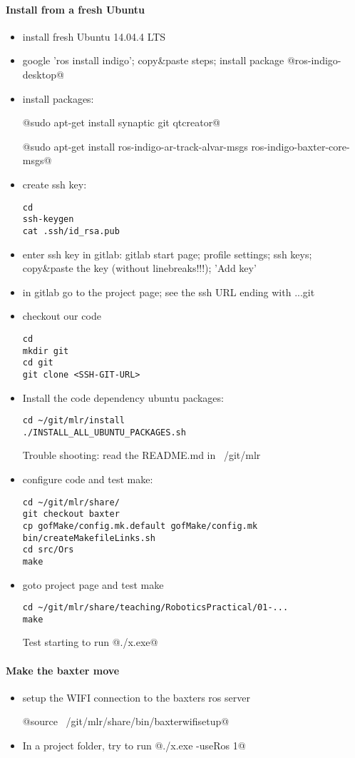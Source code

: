 \documentclass[10pt,fleqn,twoside]{article}
\begin{document}
\paragraph{Install from a fresh Ubuntu}
\begin{itemize}
\item install fresh Ubuntu 14.04.4 LTS
\item google 'ros install indigo'; copy\&paste steps; install package
  @ros-indigo-desktop@
\item install packages:

  @sudo apt-get install synaptic git qtcreator@

  @sudo apt-get install ros-indigo-ar-track-alvar-msgs ros-indigo-baxter-core-msgs@
\item create ssh key:
\begin{Verbatim}
cd
ssh-keygen
cat .ssh/id_rsa.pub
\end{Verbatim}
\item enter ssh key in gitlab: gitlab start page; profile settings;
  ssh keys; copy\&paste the key (without linebreaks!!!); 'Add key'
\item in gitlab go to the project page; see the ssh URL ending with ...git
\item checkout our code
\begin{Verbatim}
cd
mkdir git
cd git
git clone <SSH-GIT-URL>
\end{Verbatim}
\item Install the code dependency ubuntu packages: 
\begin{Verbatim}
cd ~/git/mlr/install
./INSTALL_ALL_UBUNTU_PACKAGES.sh
\end{Verbatim}
Trouble shooting: read the README.md in ~/git/mlr
\item configure code and test make:
\begin{Verbatim}
cd ~/git/mlr/share/
git checkout baxter
cp gofMake/config.mk.default gofMake/config.mk
bin/createMakefileLinks.sh
cd src/Ors
make
\end{Verbatim}
\item goto project page and test make
\begin{Verbatim}
cd ~/git/mlr/share/teaching/RoboticsPractical/01-...
make
\end{Verbatim}
Test starting to run @./x.exe@
\end{itemize}

\paragraph{Make the baxter move}
\begin{itemize}
\item setup the WIFI connection to the baxters ros server

@source ~/git/mlr/share/bin/baxterwifisetup@

\item In a project folder, try to run @./x.exe -useRos 1@
\end{itemize}
\end{document}
